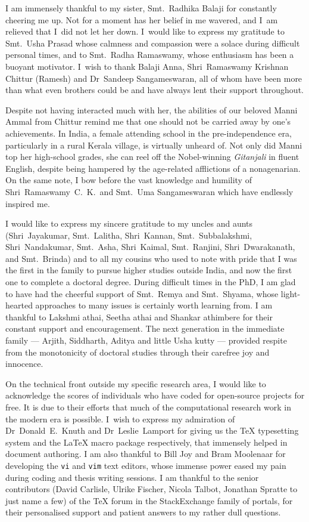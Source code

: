 I am immensely thankful to my sister, Smt.~Radhika Balaji for constantly
cheering me up. Not for a moment has her belief in me wavered, and I~am relieved
that I~did not let her down. I~would like to express my gratitude to Smt.~Usha
Prasad whose calmness and compassion were a solace during difficult personal
times, and to Smt.~Radha Ramaswamy, whose enthusiasm has been a  buoyant
motivator. I~wish to thank Balaji Anna, Shri~Ramaswamy Krishnan Chittur (Ramesh)
and Dr~Sandeep Sangameswaran, all of whom have been more than what even brothers
could be and have always lent their support throughout.



Despite not having interacted much with her, the abilities of our beloved Manni
Ammal from Chittur remind me that one should not be carried away by one's
achievements. In India, a female attending school in the pre-independence era,
particularly in a rural Kerala village, is virtually unheard of. Not only did
Manni top her high-school grades, she can reel off the Nobel-winning
\emph{Gitanjali} in fluent English, despite being hampered by the age-related
afflictions of a nonagenarian. On the same note, I bow before the
vast knowledge and humility of Shri~Ramaswamy~C.~K.\ and Smt.~Uma Sangameswaran
which have endlessly inspired me.


I would like to express my sincere gratitude to my uncles and aunts
(Shri~Jayakumar, Smt.~Lalitha, Shri~Kannan, Smt.~Subbalakshmi, Shri~Nandakumar,
Smt.~Asha, Shri~Kaimal, Smt.~Ranjini, Shri~Dwarakanath, and Smt.~Brinda) and to
all my cousins who used to note with pride that I was the first in the family to
pursue higher studies outside India, and now the first one to complete a
doctoral degree. During  difficult times in the PhD, I am glad to have had the
cheerful support of Smt.~Remya and Smt.~Shyama, whose light-hearted approaches
to many issues is certainly worth learning from. I am thankful to Lakshmi athai,
Seetha athai and Shankar athimbere for their constant support and encouragement.
The next generation in the immediate family --- Arjith, Siddharth, Aditya and
little Usha kutty --- provided respite from the monotonicity of doctoral studies
through their carefree joy and innocence.


On the technical front outside my specific research area, I would like to
acknowledge the scores of individuals who have coded for open-source projects
for free. It is due to their efforts that much of the computational research
work in the modern era is possible. I~wish to express my admiration of
\mbox{Dr~Donald E.\ Knuth} and \mbox{Dr~Leslie Lamport} for giving us the \TeX{}
typesetting system and the \LaTeX{} macro package respectively, that immensely helped
in document authoring. I am also thankful to Bill Joy
and Bram Moolenaar for developing the \texttt{vi} and \texttt{vim} text editors,
whose immense power eased my pain during coding and thesis writing sessions. I
am thankful to the senior contributors (David Carlisle, Ulrike Fischer, Nicola
Talbot, Jonathan Spratte to just name a few) of the TeX forum in the
StackExchange family of portals, for their personalised support and patient
answers to my rather dull questions.

